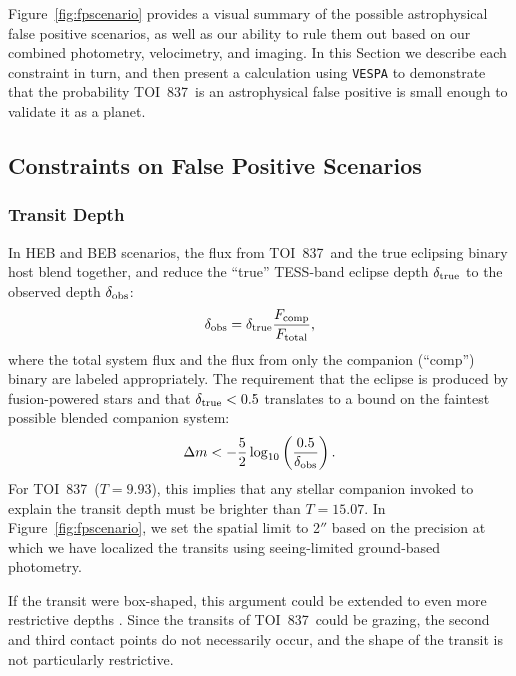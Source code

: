\documentclass[12pt,twocolumn,tighten]{aastex63}
\newcommand{\tn}{TOI~837} %
\begin{document}
Figure~\ref{fig:fpscenario} provides a visual summary of the possible
astrophysical false positive scenarios, as well as our ability to rule
them out based on our combined photometry, velocimetry, and imaging.
In this Section we describe each constraint in turn, and then present
a calculation using \texttt{VESPA} \citep{morton_efficient_2012} to
demonstrate that the probability \tn\ is an astrophysical false
positive is small enough to validate it as a planet.



\subsection{Constraints on False Positive Scenarios}
\label{subsec:fp_constraints}

\subsubsection{Transit Depth}
In HEB and BEB scenarios, the flux from \tn\ and the true eclipsing
binary host blend together, and reduce the ``true'' TESS-band eclipse
depth $\delta_{\rm true}$ to the observed depth $\delta_{\rm obs}$:
\begin{equation}
  \delta_{\rm obs}
  = 
  \delta_{\rm true} \frac{F_{\rm comp}}{F_{\rm total}},
\end{equation}
where the total system flux and the flux from only the companion
(``comp'') binary are labeled appropriately.  The requirement that the
eclipse is produced by fusion-powered stars and that $\delta_{\rm true} < 0.5$
translates to a bound on the faintest possible blended companion
system:
\begin{equation}
  \Delta m < -\frac{5}{2} \log_{10}
             \left( \frac{0.5}{\delta_{\rm obs}} \right).
\end{equation}
For \tn\ ($T=9.93$), this implies that any stellar companion invoked
to explain the transit depth must be brighter than $T=15.07$.  In
Figure~\ref{fig:fpscenario}, we set the spatial limit to 2$''$ based
on the precision at which we have localized the transits using
seeing-limited ground-based photometry.

If the transit were box-shaped, this argument could be extended to
even more restrictive depths \citep[{\it
e.g.},][]{seager_unique_2003,vanderburg_hr858_2019,rizzuto_tess_2020}.
Since the transits of \tn\ could be grazing, the second and third
contact points do not necessarily occur, and the shape of the transit
is not particularly restrictive.
\end{document}
